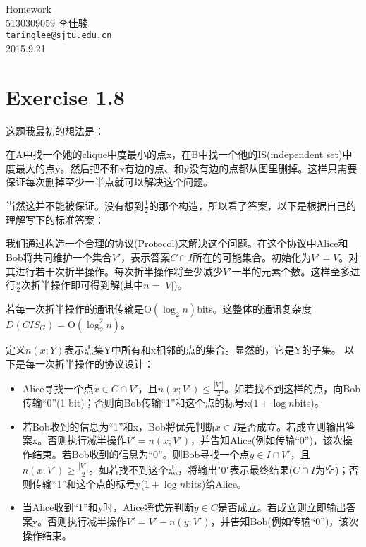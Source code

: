 \documentclass[11pt, fleqn, a4paper]{report}
\begin{document}
\begin{titlepage}
\vspace*{40mm}
\begin{center}
{\Huge Homework }\\[30mm]

{\Large 5130309059 \quad \quad 李佳骏}\\[3mm]
\texttt{taringlee@sjtu.edu.cn}\\[10mm]

2015.9.21

\end{center}
\end{titlepage}

\section*{Exercise 1.8}
这题我最初的想法是：

在A中找一个她的clique中度最小的点x，在B中找一个他的IS(independent set)中度最大的点y。然后把不和x有边的点、和y没有边的点都从图里删掉。这样只需要保证每次删掉至少一半点就可以解决这个问题。

当然这并不能被保证。没有想到$\frac{1}{2}$的那个构造，所以看了答案，以下是根据自己的理解写下的标准答案：

我们通过构造一个合理的协议(Protocol)来解决这个问题。在这个协议中Alice和Bob将共同维护一个集合$V'$，表示答案$C \cap I$所在的可能集合。初始化为$V' = V$。对其进行若干次折半操作。每次折半操作将至少减少$V'$一半的元素个数。这样至多进行$\frac{n}{2}$次折半操作即可得到解(其中$n=|V|$)。

若每一次折半操作的通讯传输是$\mathrm{O}(\log_2{n})$bits。这整体的通讯复杂度$D(CIS_G)= \mathrm{O}(\log_2^2{n})$。

定义$n(x; Y)$表示点集Y中所有和x相邻的点的集合。显然的，它是Y的子集。
以下是每一次折半操作的协议设计：
\begin{itemize}
\item Alice寻找一个点$x \in C \cap V'$，且$n(x; V') \leq \frac{|V'|}{2}$。如若找不到这样的点，向Bob传输“0”(1 bit)；否则向Bob传输“1”和这个点的标号x($1 + \log{n}$bits)。
\item 若Bob收到的信息为“1”和x，Bob将优先判断$x \in I$是否成立。若成立则输出答案x。否则执行减半操作$V' = n(x; V')$，并告知Alice(例如传输“0”)，该次操作结束。若Bob收到的信息为“0”。则Bob寻找一个点$y \in I \cap V'$，且$n(x; V') \geq \frac{|V'|}{2}$。如若找不到这个点，将输出"0"表示最终结果($C \cap I$为空)；否则传输“1”和这个点的标号y($1 + \log{n}$bits)给Alice。
\item 当Alice收到“1”和y时，Alice将优先判断$y \in C$是否成立。若成立则立即输出答案y。否则执行减半操作$V' = V' - n(y; V')$，并告知Bob(例如传输“0”)，该次操作结束。
\end{itemize}
\end{document}
